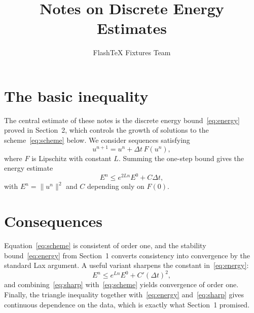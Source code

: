 \documentclass[11pt]{amsart}
\title{Notes on Discrete Energy Estimates}
\author{FlashTeX Fixtures Team}
\date{}
\numberwithin{equation}{section}
\begin{document}
\maketitle
\section{The basic inequality}
The central estimate of these notes is the discrete energy bound~\eqref{eq:energy} proved in Section~2, which controls the growth of solutions to the scheme~\eqref{eq:scheme} below. We consider sequences satisfying
\begin{equation}
u^{n+1} = u^{n} + \Delta t\, F(u^{n}),
\label{eq:scheme}
\end{equation}
where $F$ is Lipschitz with constant $L$. Summing the one-step bound gives the energy estimate
\begin{equation}
E^{n} \le e^{2Ln} E^{0} + C \Delta t,
\label{eq:energy}
\end{equation}
with $E^{n} = \|u^{n}\|^{2}$ and $C$ depending only on $F(0)$.
\section{Consequences}
Equation~\eqref{eq:scheme} is consistent of order one, and the stability bound~\eqref{eq:energy} from Section~1 converts consistency into convergence by the standard Lax argument. A useful variant sharpens the constant in~\eqref{eq:energy}:
\begin{equation}
E^{n} \le e^{Ln} E^{0} + C' (\Delta t)^{2},
\label{eq:sharp}
\end{equation}
and combining~\eqref{eq:sharp} with~\eqref{eq:scheme} yields convergence of order one. Finally, the triangle inequality together with~\eqref{eq:energy} and~\eqref{eq:sharp} gives continuous dependence on the data, which is exactly what Section~1 promised.
\end{document}
